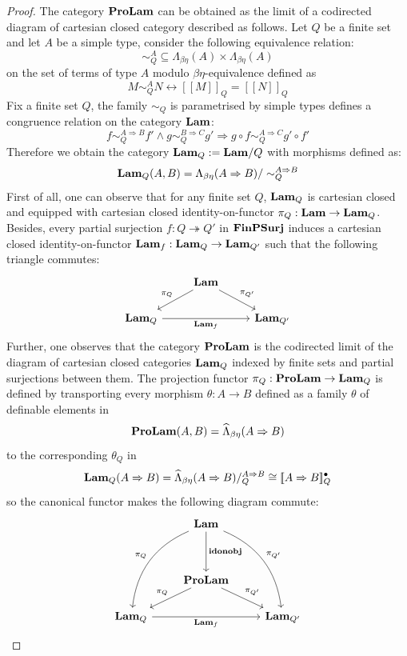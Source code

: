 \documentclass[8pt]{article}
\theoremstyle{definition}
\theoremstyle{definition}
\theoremstyle{definition}
\theoremstyle{definition}
\theoremstyle{definition}
\theoremstyle{definition}
\theoremstyle{definition}
\theoremstyle{definition}
\theoremstyle{definition}
\theoremstyle{definition}
\theoremstyle{definition}
\theoremstyle{definition}
\theoremstyle{definition}
\theoremstyle{definition}
\theoremstyle{question}
\begin{document}
\begin{proof}
  The category ${\bf ProLam}$ can be obtained as the limit of a codirected diagram of cartesian closed category
  described as follows. Let $Q$ be a finite set and let $A$ be a simple type, consider the following equivalence relation:
  \[
  \sim^A_Q \subseteq \Lambda_{\beta \eta}(A) \times \Lambda_{\beta \eta}(A)
  \]
  on the set of terms of type $A$ modulo $\beta\eta$-equivalence defined as
  \[
  M \sim^A_Q N \leftrightarrow [\![M]\!]_Q = [\![N]\!]_Q
  \]
  Fix a finite set $Q$, the family $\sim_Q$ is parametrised by simple types defines a congruence relation on the category
  ${\bf Lam}$:
  \[
  f \sim^{A \Rightarrow B}_Q f' \land g \sim^{B \Rightarrow C}_Q g' \Rightarrow g \circ f \sim^{A \Rightarrow C}_Q g' \circ f'
  \]
  Therefore we obtain the category ${\bf Lam}_Q := {\bf Lam}/Q$ with morphisms defined as:
  \[
  {\bf Lam}_Q(A,B) = \Lambda_{\beta \eta}(A \Rightarrow B)/\sim^{A \Rightarrow B}_Q
  \]
  First of all, one can observe that for any finite set $Q$, ${\bf Lam}_Q$ is cartesian closed and equipped
  with cartesian closed identity-on-functor $\pi_Q : {\bf Lam} \to {\bf Lam}_Q$. Besides,
  every partial surjection $f : Q \twoheadrightarrow Q'$ in ${\bf FinPSurj}$ induces a cartesian closed identity-on-functor
  ${\bf Lam}_f : {\bf Lam}_Q \to {\bf Lam}_{Q'}$ such that the following triangle commutes:
  \[
  \begin{tikzcd}
    & {\bf Lam} \ar[dl, "\pi_Q"'] \ar[dr, "\pi_{Q'}"] \\
    {\bf Lam}_Q \ar[rr, "{\bf Lam}_f"'] && {\bf Lam}_{Q'}
  \end{tikzcd}
  \]
  Further, one observes that the category ${\bf ProLam}$ is the codirected limit of the diagram of cartesian closed
  categories ${\bf Lam}_Q$ indexed by finite sets and partial surjections between them. The projection functor
  $\pi_Q : {\bf ProLam} \to {\bf Lam}_Q$ is defined by transporting every morphism 
  $\theta : A \to B$ defined as a family $\theta$ of definable elements in
  \[
  {\bf ProLam}(A,B) = \widehat{\Lambda}_{\beta\eta}(A \Rightarrow B)
  \]
  to the corresponding $\theta_Q$ in
  \[
  {\bf Lam}_Q(A \Rightarrow B) = \widehat{\Lambda}_{\beta\eta}(A \Rightarrow B)/^{A \Rightarrow B}_Q \cong [\![A \Rightarrow B]\!]_Q^{\bullet}
  \]
  so the canonical functor makes the following diagram commute:
  \[
  \begin{tikzcd}
  & {\bf Lam} \ar[dd, "{\bf idonobj}"] \ar[dddl, "\pi_Q"', bend right] \ar[dddr, "\pi_{Q'}", bend left] \\
  \\
  & {\bf ProLam} \ar[dl, "\pi_Q"'] \ar[dr, "\pi_{Q'}"] \\
  {\bf Lam}_Q \ar[rr, "{\bf Lam}_f"'] && {\bf Lam}_{Q'}
  \end{tikzcd}
  \]


\end{proof}
\end{document}
